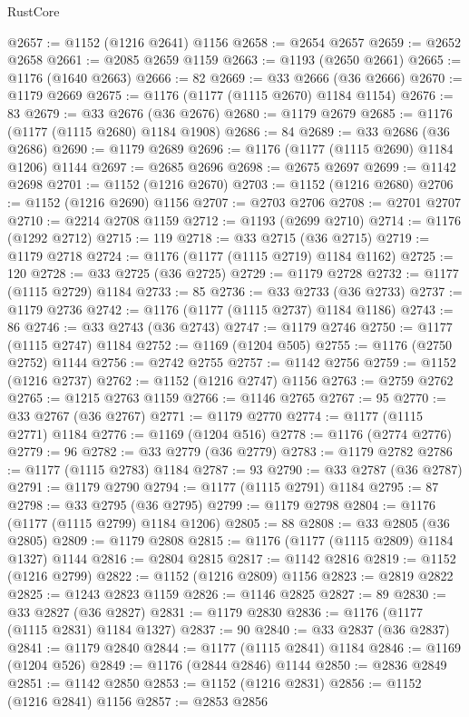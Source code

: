 \begin{lexlean}{RustCore}
\begin{coremodule}
@2657 := @1152 (@1216 @2641) @1156
@2658 := @2654 @2657
@2659 := @2652 @2658
@2661 := @2085 @2659 @1159
@2663 := @1193 (@2650 @2661)
@2665 := @1176 (@1640 @2663)
@2666 := 82
@2669 := @33 @2666 (@36 @2666)
@2670 := @1179 @2669
@2675 := @1176 (@1177 (@1115 @2670) @1184 @1154)
@2676 := 83
@2679 := @33 @2676 (@36 @2676)
@2680 := @1179 @2679
@2685 := @1176 (@1177 (@1115 @2680) @1184 @1908)
@2686 := 84
@2689 := @33 @2686 (@36 @2686)
@2690 := @1179 @2689
@2696 := @1176 (@1177 (@1115 @2690) @1184 @1206) @1144
@2697 := @2685 @2696
@2698 := @2675 @2697
@2699 := @1142 @2698
@2701 := @1152 (@1216 @2670)
@2703 := @1152 (@1216 @2680)
@2706 := @1152 (@1216 @2690) @1156
@2707 := @2703 @2706
@2708 := @2701 @2707
@2710 := @2214 @2708 @1159
@2712 := @1193 (@2699 @2710)
@2714 := @1176 (@1292 @2712)
@2715 := 119
@2718 := @33 @2715 (@36 @2715)
@2719 := @1179 @2718
@2724 := @1176 (@1177 (@1115 @2719) @1184 @1162)
@2725 := 120
@2728 := @33 @2725 (@36 @2725)
@2729 := @1179 @2728
@2732 := @1177 (@1115 @2729) @1184
@2733 := 85
@2736 := @33 @2733 (@36 @2733)
@2737 := @1179 @2736
@2742 := @1176 (@1177 (@1115 @2737) @1184 @1186)
@2743 := 86
@2746 := @33 @2743 (@36 @2743)
@2747 := @1179 @2746
@2750 := @1177 (@1115 @2747) @1184
@2752 := @1169 (@1204 @505)
@2755 := @1176 (@2750 @2752) @1144
@2756 := @2742 @2755
@2757 := @1142 @2756
@2759 := @1152 (@1216 @2737)
@2762 := @1152 (@1216 @2747) @1156
@2763 := @2759 @2762
@2765 := @1215 @2763 @1159
@2766 := @1146 @2765
@2767 := 95
@2770 := @33 @2767 (@36 @2767)
@2771 := @1179 @2770
@2774 := @1177 (@1115 @2771) @1184
@2776 := @1169 (@1204 @516)
@2778 := @1176 (@2774 @2776)
@2779 := 96
@2782 := @33 @2779 (@36 @2779)
@2783 := @1179 @2782
@2786 := @1177 (@1115 @2783) @1184
@2787 := 93
@2790 := @33 @2787 (@36 @2787)
@2791 := @1179 @2790
@2794 := @1177 (@1115 @2791) @1184
@2795 := 87
@2798 := @33 @2795 (@36 @2795)
@2799 := @1179 @2798
@2804 := @1176 (@1177 (@1115 @2799) @1184 @1206)
@2805 := 88
@2808 := @33 @2805 (@36 @2805)
@2809 := @1179 @2808
@2815 := @1176 (@1177 (@1115 @2809) @1184 @1327) @1144
@2816 := @2804 @2815
@2817 := @1142 @2816
@2819 := @1152 (@1216 @2799)
@2822 := @1152 (@1216 @2809) @1156
@2823 := @2819 @2822
@2825 := @1243 @2823 @1159
@2826 := @1146 @2825
@2827 := 89
@2830 := @33 @2827 (@36 @2827)
@2831 := @1179 @2830
@2836 := @1176 (@1177 (@1115 @2831) @1184 @1327)
@2837 := 90
@2840 := @33 @2837 (@36 @2837)
@2841 := @1179 @2840
@2844 := @1177 (@1115 @2841) @1184
@2846 := @1169 (@1204 @526)
@2849 := @1176 (@2844 @2846) @1144
@2850 := @2836 @2849
@2851 := @1142 @2850
@2853 := @1152 (@1216 @2831)
@2856 := @1152 (@1216 @2841) @1156
@2857 := @2853 @2856

\end{coremodule}
\end{lexlean}
